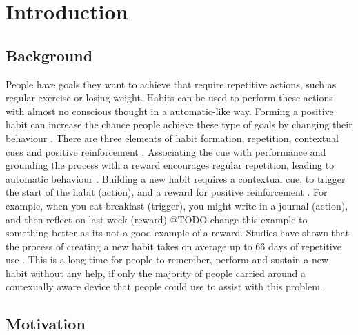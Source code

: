 
\section{Introduction}

\subsection*{Background}
People have goals they want to achieve that require repetitive actions, such as regular exercise or losing weight. Habits can be used to perform these actions with almost no conscious thought in a automatic-like way. Forming a positive habit can increase the chance people achieve these type of goals by changing their behaviour \cite{article_promoting_habit_formation}. There are three elements of habit formation, repetition, contextual cues and positive reinforcement \cite{article_beyond_self_tracking_designing_apps}. Associating the cue with performance and grounding the process with a reward encourages regular repetition, leading to automatic behaviour \cite{article_experiences_of_habit_formation}. Building a new habit requires a contextual cue, to trigger the start of the habit (action), and a reward for positive reinforcement \cite{article_beyond_self_tracking_designing_apps, article_how_habits_formed_modelling_habit_formation}. For example, when you eat breakfast (trigger), you might write in a journal (action), and then reflect on last week (reward) @TODO change this example to something better as its not a good example of a reward. Studies have shown that the process of creating a new habit takes on average up to 66 days of repetitive use \cite{article_how_habits_formed_modelling_habit_formation}. This is a long time for people to remember, perform and sustain a new habit without any help, if only the majority of people carried around a contexually aware device that people could use to assist with this problem.

\subsection*{Motivation}

